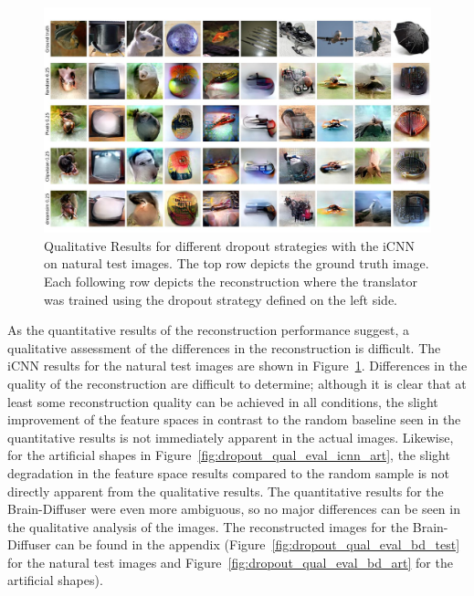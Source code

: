 \begin{figure}[ht]
  \centering
  \includegraphics[width=1\textwidth]{plots/dropout_qual_eval_icnn_test.JPEG}
  \caption[Experiment 1: Reconstructed images for iCNN on natural test images]{Qualitative Results for different dropout strategies with the iCNN on natural test images. The top row depicts the ground truth image. Each following row depicts the reconstruction where the translator was trained using the dropout strategy defined on the left side.}\label{fig:dropout_qual_eval_icnn_test}
\end{figure}

As the quantitative results of the reconstruction performance suggest, a qualitative assessment of the differences in the reconstruction is difficult. The iCNN results for the natural test images are shown in Figure~\ref{fig:dropout_qual_eval_icnn_test}. Differences in the quality of the reconstruction are difficult to determine; although it is clear that at least some reconstruction quality can be achieved in all conditions, the slight improvement of the feature spaces in contrast to the random baseline  seen in the quantitative results is not immediately apparent in the actual images. Likewise, for the artificial shapes in Figure~\ref{fig:dropout_qual_eval_icnn_art}, the slight degradation in the feature space results compared to the random sample is not directly apparent from the qualitative results. The quantitative results for the Brain-Diffuser were even more ambiguous, so no major differences can be seen in the qualitative analysis of the images. The reconstructed images for the Brain-Diffuser can be found in the appendix (Figure~\ref{fig:dropout_qual_eval_bd_test} for the natural test images and Figure~\ref{fig:dropout_qual_eval_bd_art} for the artificial shapes).


